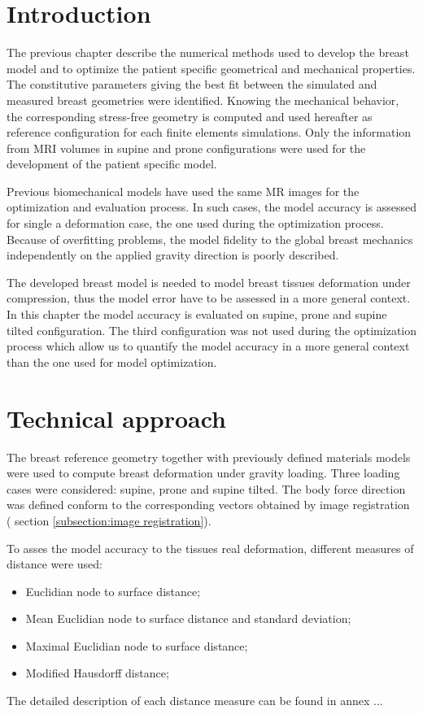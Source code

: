 
\section{Introduction}\label{section:introduction}

The previous chapter describe the numerical methods used to develop the breast model and to optimize the patient specific geometrical and mechanical properties. The constitutive parameters giving the best fit between the simulated and measured breast geometries were identified. Knowing the mechanical behavior, the corresponding stress-free geometry is computed and used hereafter as reference configuration for each finite elements simulations. Only the information from MRI volumes in supine and prone configurations were used for the development of the patient specific model. 

Previous biomechanical models have used the same MR images for the optimization and evaluation process. In such cases, the model accuracy is assessed for single a deformation case, the one used during the optimization process. Because of overfitting problems, the model fidelity to the global breast mechanics independently on the applied gravity direction is poorly described. 

The developed breast model is needed to model breast tissues deformation under compression, thus the model error have to be assessed in a more general context. In this chapter  the model accuracy is evaluated on supine, prone and supine tilted configuration. The third configuration was not used during the optimization process which allow us to quantify the model accuracy in a more general context than the one used for model optimization.
 

\clearpage

\section{Technical approach}\label{section:validation:technical approach}

The breast reference geometry together with previously defined materials models were used to compute breast deformation under gravity loading. Three loading cases were considered: supine, prone and supine tilted. The body force direction was defined conform to the corresponding vectors obtained by image registration ( section \ref{subsection:image registration}). 

To asses the model accuracy to the tissues real deformation, different measures of distance were used: 
\begin{itemize}
\item  Euclidian node to surface distance;
\item  Mean Euclidian node to surface distance and standard deviation;
\item  Maximal Euclidian node to surface distance; 
\item  Modified Hausdorff distance;
\end{itemize} 
The detailed description of each distance measure can be found in annex ...

